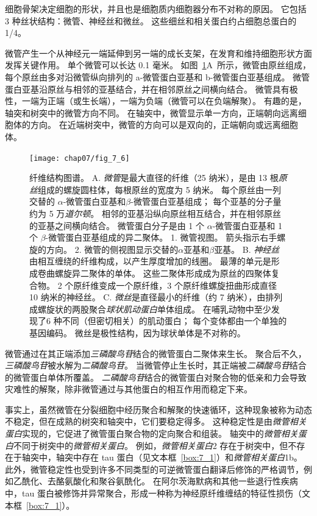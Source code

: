 细胞骨架决定细胞的形状，并且也是细胞质内细胞器分布不对称的原因。
它包括 3 种丝状结构：微管、神经丝和微丝。
这些细丝和相关蛋白约占细胞总蛋白的 1/4。


微管产生一个从神经元一端延伸到另一端的成长支架，在发育和维持细胞形状方面发挥关键作用。
单个微管可以长达 0.1 毫米。
如图~\ref{fig:7_6}A~所示，微管由原丝组成，每个原丝由多对沿微管纵向排列的 a-微管蛋白亚基和 b-微管蛋白亚基组成。
微管蛋白亚基沿原丝与相邻的亚基结合，并在相邻原丝之间横向结合。
微管具有极性，一端为正端（或生长端），一端为负端（微管可以在负端解聚）。
有趣的是，轴突和树突中的微管方向不同。
在轴突中，微管显示单一方向，正端朝向远离细胞体的方向。
在近端树突中，微管的方向可以是双向的，正端朝向或远离细胞体。


\begin{figure}[htbp]
	\centering
	\texttt{[image: chap07/fig\_7\_6]}
	\caption{纤维结构图谱。
		A. \textit{微管}是最大直径的纤维（25 纳米），是由 13 根\textit{原丝}组成的螺旋圆柱体，每根原丝的宽度为 5 纳米。
		每个原丝由一列交替的 $\alpha$-微管蛋白亚基和$\beta$-微管蛋白亚基组成；
		每个亚基的分子量约为 5 万\textit{道尔顿}。
		相邻的亚基沿纵向原丝相互结合，并在相邻原丝的亚基之间横向结合。
		微管蛋白分子是由 1 个 $\alpha$-微管蛋白亚基和 1 个 $\beta$-微管蛋白亚基组成的异二聚体。
		1. 微管视图。
		箭头指示右手螺旋的方向。
		2. 微管的侧视图显示交替的$\alpha$亚基和$\beta$亚基。
		B. \textit{神经丝}由相互缠绕的纤维构成，以产生厚度增加的线圈。
		最薄的单元是形成卷曲螺旋异二聚体的单体。
		这些二聚体形成成为原丝的四聚体复合物。
		2 个原纤维变成一个原纤维，3 个原纤维螺旋扭曲形成直径 10 纳米的神经丝\cite{bershadsky2012cytoskeleton}。
		C. \textit{微丝}是直径最小的纤维（约 7 纳米），由排列成螺旋状的两股聚合\textit{球状肌动蛋白}单体组成。
		在哺乳动物中至少发现了6 种不同（但密切相关）的肌动蛋白；
		每个变体都由一个单独的基因编码。
		微丝是极性结构，因为球状单体是不对称的。}
	\label{fig:7_6}
\end{figure}


微管通过在其正端添加\textit{三磷酸鸟苷}结合的微管蛋白二聚体来生长。
聚合后不久，\textit{三磷酸鸟苷}被水解为\textit{二磷酸鸟苷}。
当微管停止生长时，其正端被\textit{二磷酸鸟苷}结合的微管蛋白单体所覆盖。
\textit{二磷酸鸟苷}结合的微管蛋白对聚合物的低亲和力会导致灾难性的解聚，除非微管通过与其他蛋白的相互作用而稳定下来。


事实上，虽然微管在分裂细胞中经历聚合和解聚的快速循环，这种现象被称为动态不稳定，但在成熟的树突和轴突中，它们要稳定得多。
这种稳定性是由\textit{微管相关蛋白}实现的，它促进了微管蛋白聚合物的定向聚合和组装。
轴突中的\textit{微管相关蛋白}不同于树突中的\textit{微管相关蛋白}。
例如，\textit{微管相关蛋白}2 存在于树突中，但不存在于轴突中，轴突中存在 tau 蛋白（见文本框~\ref{box:7_1}）和\textit{微管相关蛋白}1b。
此外，微管稳定性也受到许多不同类型的可逆微管蛋白翻译后修饰的严格调节，例如乙酰化、去酪氨酸化和聚谷氨酰化。
在阿尔茨海默病和其他一些退行性疾病中，tau 蛋白被修饰并异常聚合，形成一种称为神经原纤维缠结的特征性损伤（文本框~\ref{box:7_1}）。



